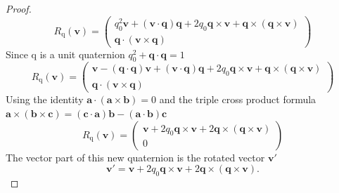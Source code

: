 \documentclass{amsart}
\theoremstyle{definition}
\theoremstyle{remark}
\numberwithin{equation}{section}
\begin{document}
\begin{proof}
  \begin{equation}
     R_\mathrm{q} (\mathbf{v}) =
    \begin{pmatrix}
      q_0^2\mathbf{v} + (\mathbf{v}\cdot\mathbf{q})\mathbf{q} + 2q_0\mathbf{q}\times\mathbf{v} + \mathbf{q}\times\left(\mathbf{q}\times\mathbf{v}\right) \\
      \mathbf{q} \cdot (\mathbf{v}\times\mathbf{q})
    \end{pmatrix} \nonumber
  \end{equation}
  Since $\mathrm{q}$ is a unit quaternion $q_0^2+\mathbf{q}\cdot\mathbf{q}=1$
  \begin{equation}
     R_\mathrm{q} (\mathbf{v}) =
    \begin{pmatrix}
      \mathbf{v}-(\mathbf{q}\cdot\mathbf{q})\mathbf{v} + (\mathbf{v}\cdot\mathbf{q})\mathbf{q} + 2q_0\mathbf{q}\times\mathbf{v} + \mathbf{q}\times\left(\mathbf{q}\times\mathbf{v}\right)\\
      \mathbf{q}\cdot(\mathbf{v}\times\mathbf{q})
    \end{pmatrix} \nonumber
  \end{equation}
  Using the identity $\mathbf{a}\cdot(\mathbf{a}\times\mathbf{b})=0$ and the triple cross product formula $\mathbf{a}\times(\mathbf{b}\times\mathbf{c})=(\mathbf{c}\cdot\mathbf{a})\mathbf{b}-(\mathbf{a}\cdot\mathbf{b})\mathbf{c}$
  \begin{equation}
    R_\mathrm{q}(\mathbf{v}) = \begin{pmatrix}
      \mathbf{v}+2q_0\mathbf{q}\times\mathbf{v}+2\mathbf{q}\times\left(\mathbf{q}\times\mathbf{v}\right) \\
      0
    \end{pmatrix} \nonumber
  \end{equation}
  The vector part of this new quaternion is the rotated vector $\mathbf{v}'$
  \begin{equation}
    \mathbf{v}' = \mathbf{v}+2q_0\mathbf{q}\times\mathbf{v}+2\mathbf{q}\times\left(\mathbf{q}\times\mathbf{v}\right). \nonumber
  \end{equation}
\end{proof}
\end{document}
